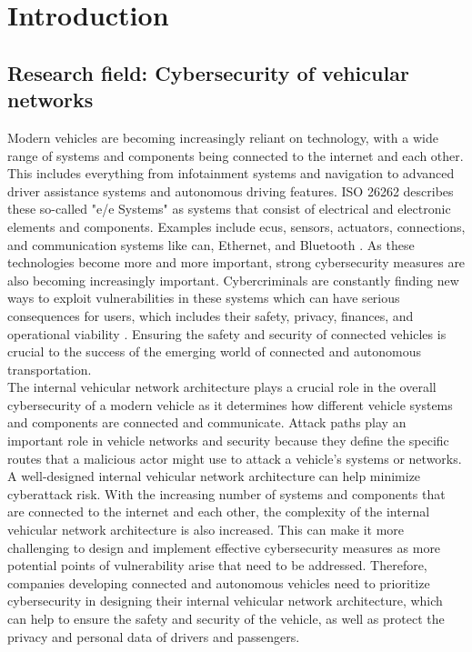 \chapter{Introduction}
\label{chp:introduction}

\section{Research field: Cybersecurity of vehicular networks}
\label{sec:field}

Modern vehicles are becoming increasingly reliant on technology, with a wide range of systems and components being connected to the internet and each other. 
This includes everything from infotainment systems and navigation to advanced driver assistance systems and autonomous driving features.
ISO 26262 describes these so-called "\gls{e/e} Systems" as systems that consist of electrical and electronic elements and components.
Examples include \gls{ecu}s, sensors, actuators, connections, and communication systems like \gls{can}, Ethernet, and Bluetooth \cite{iso26262}.
As these technologies become more and more important, strong cybersecurity measures are also becoming increasingly important. 
Cybercriminals are constantly finding new ways to exploit vulnerabilities in these systems which can have serious consequences for users, 
which includes their safety, privacy, finances, and operational viability \cite{iso21434}. 
Ensuring the safety and security of connected vehicles is crucial to the success of the emerging world of connected and autonomous transportation.
\\

The internal vehicular network architecture plays a crucial role in the overall cybersecurity of a modern vehicle as it determines how different vehicle systems and components are connected and communicate.
Attack paths play an important role in vehicle networks and security because they define the specific routes that a malicious actor might use to attack a vehicle's systems or networks. 
A well-designed internal vehicular network architecture can help minimize cyberattack risk.
With the increasing number of systems and components that are connected to the internet and each other, the complexity of the internal vehicular network architecture is also increased. 
This can make it more challenging to design and implement effective cybersecurity measures as more potential points of vulnerability arise that need to be addressed. 
Therefore, companies developing connected and autonomous vehicles need to prioritize cybersecurity in designing their internal vehicular network architecture, 
which can help to ensure the safety and security of the vehicle, as well as protect the privacy and personal data of drivers and passengers.
\\

